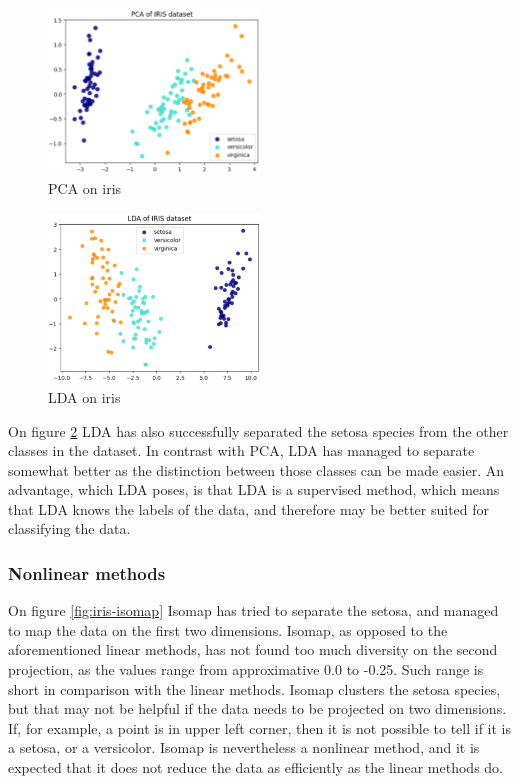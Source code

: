 \begin{figure}[h]
\centering
\includegraphics[width=0.5\textwidth]{figures/theory-example-figures/iris-pca.png}
\caption{PCA on iris}
\label{fig:iris-pca}
\end{figure}


\begin{figure}[h]
    \centering
    \includegraphics[width=0.5\textwidth]{figures/theory-example-figures/iris-lda.png}
    \caption{LDA on iris}
    \label{fig:iris-lda}
    \end{figure}
    
On figure \ref{fig:iris-lda} LDA has also successfully separated the setosa species from the other classes in the dataset. In contrast with PCA, LDA has managed to separate somewhat better as the distinction between those classes can be made easier. An advantage, which LDA poses, is that LDA is a supervised method, which means that LDA knows the labels of the data, and therefore may be better suited for classifying the data.

\subsubsection{Nonlinear methods}
On figure \ref{fig:iris-isomap} Isomap has tried to separate the setosa, and managed to map the data on the first two dimensions. Isomap, as opposed to the aforementioned linear methods, has not found too much diversity on the second projection, as the values range from approximative 0.0 to -0.25. Such range is short in comparison with the linear methods. Isomap clusters the setosa species, but that may not be helpful if the data needs to be projected on two dimensions. If, for example, a point is in upper left corner, then it is not possible to tell if it is a setosa, or a versicolor. Isomap is nevertheless a nonlinear method, and it is expected that it does not reduce the data as efficiently as the linear methods do.

